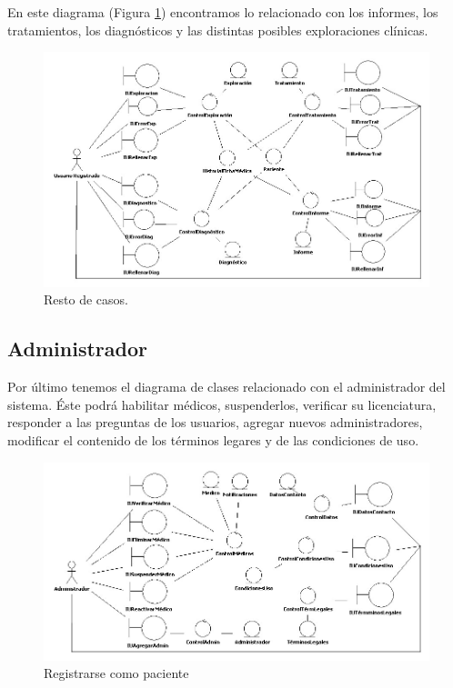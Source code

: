 	\newpage
	En este diagrama (Figura \ref{fig:col_clase14}) encontramos lo relacionado con los informes, los tratamientos, los diagnósticos y las distintas posibles exploraciones clínicas.
	\begin{figure}[H]
	  \centering
	    \includegraphics[width=16cm]{img/jpg/clases/13_Resto.jpg}
	  \caption{Resto de casos.}
	  \label{fig:col_clase14}
	\end{figure}
	
\newpage
\subsection{Administrador} %
\label{sub:administrador}
	Por último tenemos el diagrama de clases relacionado con el administrador del sistema. Éste podrá habilitar médicos, suspenderlos, verificar su licenciatura, responder a las preguntas de los usuarios, agregar nuevos administradores, modificar el contenido de los términos legares y de las condiciones de uso.
	\begin{figure}[H]
	  \centering
	    \includegraphics[width=16cm]{img/jpg/clases/14_Administrador.jpg}
	  \caption{Registrarse como paciente}
	  \label{fig:col_clase15}
	\end{figure}
	


